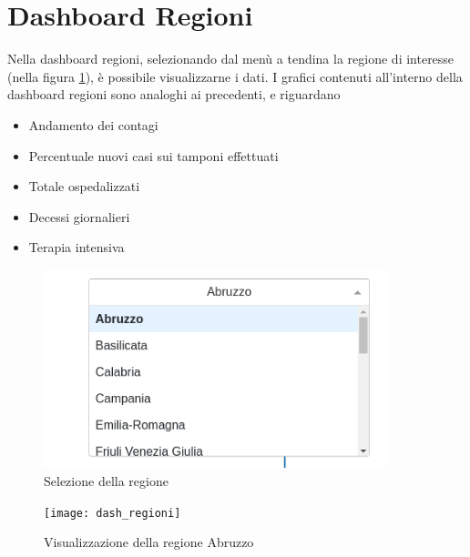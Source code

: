 \section{Dashboard Regioni}
Nella dashboard regioni, selezionando dal menù a tendina la regione di interesse (nella figura \ref{fig:tendina}), è possibile visualizzarne i dati.
I grafici contenuti all’interno della dashboard regioni sono analoghi ai precedenti, e riguardano
\begin{itemize}
\item Andamento dei contagi
\item Percentuale nuovi casi sui tamponi effettuati
\item Totale ospedalizzati
\item Decessi giornalieri
\item Terapia intensiva
\end{itemize}
\begin{figure}[htp]
    \centering
    \includegraphics[width=10cm]{img/tendina_regioni.png}
    \caption{Selezione della regione}
    \label{fig:tendina}
\end{figure}

\begin{figure}[htp]
    \centering
    \texttt{[image: dash\_regioni]}
    \caption{Visualizzazione della regione Abruzzo}
    \label{fig:dash_regioni}
\end{figure}